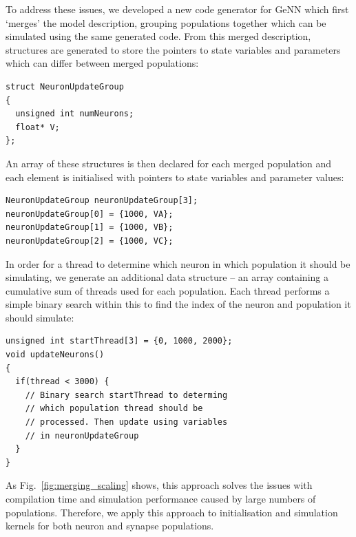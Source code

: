 \documentclass[9pt,twocolumn,twoside,lineno]{pnas-new}
\begin{document}
To address these issues, we developed a new code generator for GeNN which first `merges' the model description, grouping populations together which can be simulated using the same generated code.
From this merged description, structures are generated to store the pointers to state variables and parameters which can differ between merged populations:
%
\begin{lstlisting}
struct NeuronUpdateGroup
{
  unsigned int numNeurons;
  float* V;  
};

\end{lstlisting}
%
An array of these structures is then declared for each merged population and each element is initialised with pointers to state variables and parameter values:
%
\begin{lstlisting}
NeuronUpdateGroup neuronUpdateGroup[3];
neuronUpdateGroup[0] = {1000, VA};
neuronUpdateGroup[1] = {1000, VB};
neuronUpdateGroup[2] = {1000, VC};
\end{lstlisting}
%
In order for a thread to determine which neuron in which population it should be simulating, we generate an additional data structure -- an array containing a cumulative sum of threads used for each population.
Each thread performs a simple binary search within this to find the index of the neuron and population it should simulate:
%
\begin{lstlisting}
unsigned int startThread[3] = {0, 1000, 2000};
void updateNeurons()
{
  if(thread < 3000) {
    // Binary search startThread to determing
    // which population thread should be 
    // processed. Then update using variables 
    // in neuronUpdateGroup
  }
}
\end{lstlisting}
%
As Fig.~\ref{fig:merging_scaling} shows, this approach solves the issues with compilation time and simulation performance caused by large numbers of populations.
Therefore, we apply this approach to initialisation and simulation kernels for both neuron and synapse populations.
\end{document}
